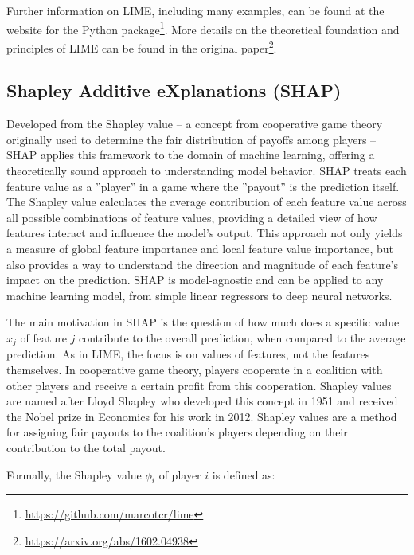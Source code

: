 \begin{resourcebox}

Further information on LIME, including many examples, can be found at the website for the Python package\footnote{\url{https://github.com/marcotcr/lime}}. More details on the theoretical foundation and principles of LIME can be found in the original paper\footnote{\url{https://arxiv.org/abs/1602.04938}}.

\end{resourcebox}

\subsection{Shapley Additive eXplanations (SHAP)}

Developed from the Shapley value -- a concept from cooperative game theory originally used to determine the fair distribution of payoffs among players -- SHAP applies this framework to the domain of machine learning, offering a theoretically sound approach to understanding model behavior. SHAP treats each feature value as a ''player'' in a game where the ''payout'' is the prediction itself. The Shapley value calculates the average contribution of each feature value across all possible combinations of feature values, providing a detailed view of how features interact and influence the model's output. This approach not only yields a measure of global feature importance and local feature value importance, but also provides a way to understand the direction and magnitude of each feature's impact on the prediction. SHAP is model-agnostic and can be applied to any machine learning model, from simple linear regressors to deep neural networks. 

The main motivation in SHAP is the question of how much does a specific value $x_j$ of feature $j$ contribute to the overall prediction, when compared to the average prediction. As in LIME, the focus is on values of features, not the features themselves. In cooperative game theory, players cooperate in a coalition with other players and receive a certain profit from this cooperation. Shapley values are named after Lloyd Shapley who developed this concept in 1951 and received the Nobel prize in Economics for his work in 2012. Shapley values are a method for assigning fair payouts to the coalition's players depending on their contribution to the total payout. 

Formally, the Shapley value $\phi_i$ of player $i$ is defined as:

